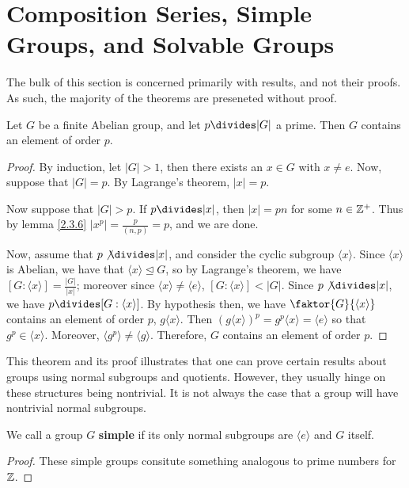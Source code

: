 \section{Composition Series, Simple Groups, and Solvable Groups}
\label{section_3.5}

The bulk of this section is concerned primarily with results, and not their
proofs. As such, the majority of the theorems are preseneted without proof.

\begin{theorem}\label{theorem_3.5.1}
  Let $G$ be a finite Abelian group, and let  $p \divides |G|$ a prime. Then
  $G$ contains an element of order  $p$.
\end{theorem}
\begin{proof}
  By induction, let $|G|>1$, then there exists an $x \in G$ with  $x \neq
  e$. Now, suppose that $|G|=p$. By  Lagrange's theorem, $|x|=p$.

  Now suppose that $|G|>p$. If $p \divides |x|$, then $|x|=pn$ for some
  $n \in \mathbb{Z}^+$. Thus by lemma \ref{2.3.6} $|x^p|=\frac{p}{(n,p)}=p$, and
  we are done.

  Now, assume that $p \not{\divides} |x|$, and consider the cyclic
  subgroup $\langle x \rangle$. Since $\langle x \rangle$ is Abelian,
  we have that $\langle x \rangle \unlhd G$, so by Lagrange's theorem,
  we have $[G: \langle x \rangle]=\frac{|G|}{|x|}$; moreover since
  $\langle x \rangle \neq \langle e \rangle$, $[G: \langle x \rangle]
  < |G|$. Since $p \not{\divides} |x|$, we have $p \divides [G :
  \langle x \rangle]$. By hypothesis then, we have $\faktor{G}{\langle
  x \rangle}$ contains an element of order $p$,  $g\langle x \rangle$.
  Then $(g\langle x \rangle)^p=g^p\langle x \rangle=\langle e \rangle$
  so that $g^p \in \langle x \rangle$. Moreover, $\langle g^p \rangle
  \neq \langle g \rangle$. Therefore, $G$ contains an element of order
  $p$.
\end{proof}
\begin{remark}
  This theorem and its proof illustrates that one can prove certain results
  about groups using normal subgroups and quotients. However, they usually
  hinge on these structures being nontrivial. It is not always the case that a
  group will have nontrivial normal subgroups.
\end{remark}

\begin{definition}
  We call a group $G$ \textbf{simple} if its only normal subgroups are
  $\langle e \rangle$ and $G$ itself.
\end{definition}
\begin{proof}
  These simple groups consitute something analogous to prime numbers
  for $\mathbb{Z}$.
\end{proof}

